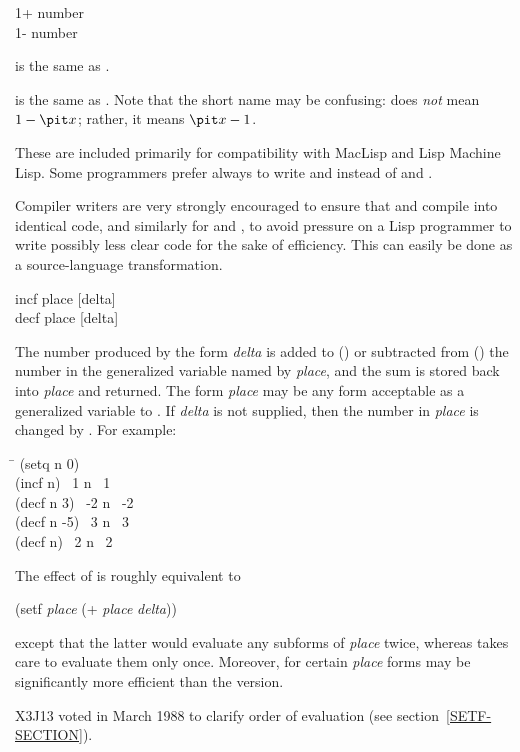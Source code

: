 \begin{defun}[Function]
1+ number \\
1- number

 is the same as .

 is the same as .
Note that the short name may be confusing:  does {\it not} mean
$1-{\it x}$; rather, it means ${\it x}-1$.

\beforenoterule
\begin{rationale}
These are included primarily for compatibility with MacLisp
and Lisp Machine Lisp.  Some programmers prefer always to write  and
 instead of  and .
\end{rationale}
\betweennoterule
\begin{implementation}
Compiler writers are very strongly encouraged to ensure
that  and  compile into identical code, and
similarly for  and , to avoid pressure on a Lisp
programmer to write possibly less clear code for the sake of efficiency.
This can easily be done as a source-language transformation.
\end{implementation}
\afternoterule
\end{defun}

\begin{defmac}
incf place [delta] \\
decf place [delta]

The number produced by the form {\it delta}
is added to () or subtracted from ()
the number in the generalized variable named by {\it place},
and the sum is stored back into {\it place} and returned.
The form {\it place} may be any form acceptable
as a generalized variable to .
If {\it delta} is not supplied, then the number in {\it place} is changed
by .
For example:
\begin{lisp}
\hskip 9pc\=\kill
(setq n 0) \\
(incf n) \EV\ 1 n \EV\ 1 \\
(decf n 3) \EV\ -2 n \EV\ -2 \\
(decf n -5) \EV\ 3 n \EV\ 3 \\
(decf n) \EV\ 2 n \EV\ 2
\end{lisp}
The effect of 
is roughly equivalent to
\begin{lisp}
(setf {\it place} (+ {\it place} {\it delta}))
\end{lisp}
except that the latter would evaluate any subforms of {\it place}
twice, whereas  takes care to evaluate them only once.
Moreover, for certain {\it place} forms  may be
significantly more efficient than the  version.
\begin{newer}
X3J13 voted in March 1988 
to clarify order of evaluation (see section~\ref{SETF-SECTION}).
\end{newer}
\end{defmac}

